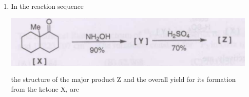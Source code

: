 \documentclass[journal,12pt,onecolumn]{IEEEtran}
\theoremstyle{remark}
\begin{document}
\begin{enumerate}[resume]
\item In the reaction sequence
    \begin{center}
        \includegraphics[width=0.8\columnwidth]{q36}
    \end{center}
    the structure of the major product Z and the overall yield for its formation from the ketone X, are
    \begin{enumerate}
\end{enumerate}
\hfill{}




\end{enumerate}
\end{document}
